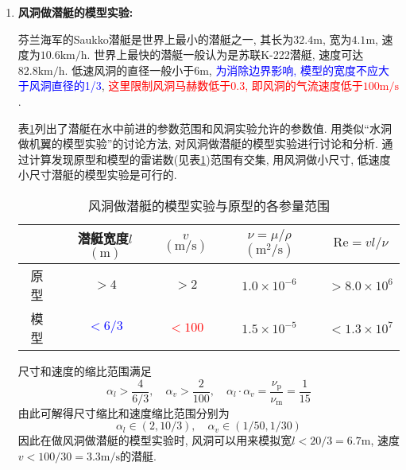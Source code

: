 \begin{solution}
\begin{enumerate}
\item \textbf{风洞做潜艇的模型实验:}

\begin{minipage}[c]{0.6\linewidth}

芬兰海军的Saukko\cite{Saukko}潜艇是世界上最小的潜艇之一, 其长为$32.4\mathrm{m}$, 宽为$4.1\mathrm{m}$, 速度为$10.6\mathrm{km/h}$. 世界上最快的潜艇一般认为是苏联K-222潜艇\cite{K-222}, 速度可达$82.8\mathrm{km/h}$. 低速风洞的直径一般小于$6\mathrm{m}$\cite{baike_wind_tunnel,wike_wind_tunnel}, \textcolor{blue}{为消除边界影响, 模型的宽度不应大于风洞直径的1/3}, \textcolor{red}{这里限制风洞马赫数低于0.3, 即风洞的气流速度低于$100\mathrm{m/s}$}. 
\end{minipage}
\begin{minipage}[c]{0.4\linewidth}
\begin{center}

\end{center}
\end{minipage}

表\ref{tab:submarineINair}列出了潜艇在水中前进的参数范围和风洞实验允许的参数值.
用类似``水洞做机翼的模型实验''的讨论方法, 对风洞做潜艇的模型实验进行讨论和分析. 通过计算发现原型和模型的雷诺数(见表\ref{tab:submarineINair})范围有交集, 用风洞做小尺寸, 低速度小尺寸潜艇的模型实验是可行的.
\begin{table}[!htb]\label{tab:submarineINair}
\centering
\caption{风洞做潜艇的模型实验与原型的各参量范围}
\begin{tabular}{c|ccc|c}
\hline 
 &潜艇宽度$l$$(\mathrm{m})$ & $v$$(\mathrm{m/s})$ & $\nu=\mu/\rho$$(\mathrm{m^2/s})$ & $\mathrm{Re}=vl/\nu$\tabularnewline
\hline 
原型 & $>4$ & $>2$ & $1.0\times 10^{-6}$ & $>8.0\times 10^6$\tabularnewline
\hline 
模型 & \textcolor{blue}{$<6/3$} & \textcolor{red}{$<100$} & $1.5\times 10^{-5}$ & $<1.3\times 10^7$\tabularnewline
\hline 
\end{tabular}
\end{table}

尺寸和速度的缩比范围满足
\[
\alpha_l>\frac{4}{6/3}, \quad \alpha_v>\frac{2}{100}, \quad \alpha_l\cdot \alpha_v = \frac{\nu_\mathrm{p}}{\nu_\mathrm{m}} = \frac{1}{15}
\]
由此可解得尺寸缩比和速度缩比范围分别为
\[
\alpha_l \in (2,10/3), \quad \alpha_v \in (1/50, 1/30)
\]
因此在做风洞做潜艇的模型实验时, 风洞可以用来模拟宽$l<20/3=6.7\mathrm{m}$, 速度$v<100/30=3.3\mathrm{m/s}$的潜艇.

\end{enumerate}
\end{solution}
\label{problem:12}
